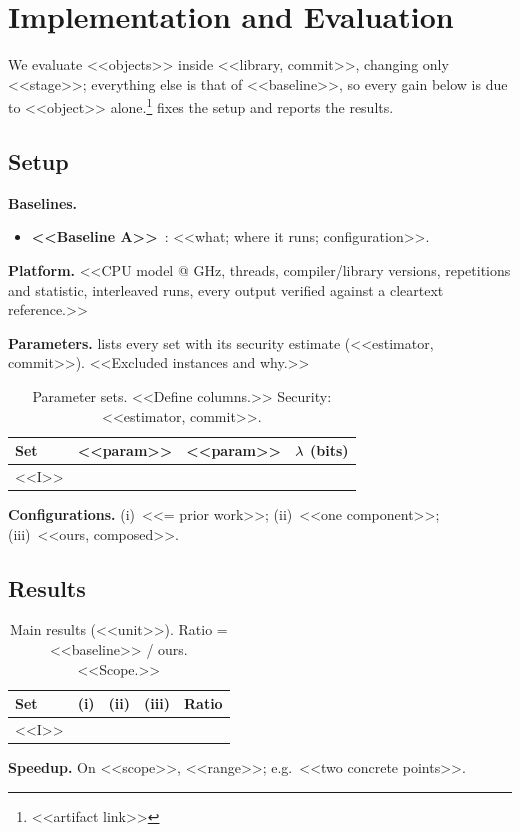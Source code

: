 \section{Implementation and Evaluation}\label{sec:eval}
We evaluate <<objects>> inside <<library, commit>>, changing only <<stage>>; everything
else is that of <<baseline>>, so every gain below is due to <<object>> alone.\footnote{<<artifact link>>}
 fixes the setup and  reports the results.

\subsection{Setup}\label{sec:eval:setup}
\noindent\textbf{Baselines.}
\begin{itemize}
\item \textbf{<<Baseline A>>}~\cite{ToyEprint}: <<what; where it runs; configuration>>.
\end{itemize}
\noindent\textbf{Platform.} <<CPU model @ GHz, threads, compiler/library versions, repetitions
and statistic, interleaved runs, every output verified against a cleartext reference.>>

\noindent\textbf{Parameters.}  lists every set with its security estimate
(<<estimator, commit>>). <<Excluded instances and why.>>
\begin{table}[t]\centering\scriptsize
\caption{Parameter sets. <<Define columns.>> Security: <<estimator, commit>>.}\label{tab:params}
\begin{tabular}{lccc}\toprule Set & <<param>> & <<param>> & $\lambda$ (bits)\\\midrule <<I>> & & & \\\bottomrule\end{tabular}
\end{table}

\noindent\textbf{Configurations.} (i)~<<= prior work>>; (ii)~<<one component>>; (iii)~<<ours, composed>>.

\subsection{Results}\label{sec:eval:results}
\begin{table}[t]\centering\scriptsize
\caption{Main results (<<unit>>). Ratio = <<baseline>> / ours. <<Scope.>>}\label{tab:main}
\begin{tabular}{lcccc}\toprule Set & (i) & (ii) & (iii) & Ratio\\\midrule <<I>> & & & & \\\bottomrule\end{tabular}
\end{table}
\noindent\textbf{Speedup.} On <<scope>>, <<range>>; e.g.\ <<two concrete points>>.

